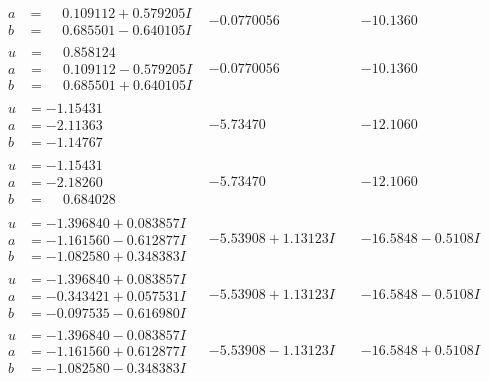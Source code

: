 \documentclass[1p]{elsarticle_modified}
\theoremstyle{definition}
\begin{document}
$$\begin{array}{c|c|c}
\begin{aligned}
a &= \phantom{-}0.109112 + 0.579205 I \\
b &= \phantom{-}0.685501 - 0.640105 I\end{aligned}
 & -0.0770056\phantom{ +0.000000I} & -10.1360\phantom{ +0.000000I} \\ \hline\begin{aligned}
u &= \phantom{-}0.858124\phantom{ +0.000000I} \\
a &= \phantom{-}0.109112 - 0.579205 I \\
b &= \phantom{-}0.685501 + 0.640105 I\end{aligned}
 & -0.0770056\phantom{ +0.000000I} & -10.1360\phantom{ +0.000000I} \\ \hline\begin{aligned}
u &= -1.15431\phantom{ +0.000000I} \\
a &= -2.11363\phantom{ +0.000000I} \\
b &= -1.14767\phantom{ +0.000000I}\end{aligned}
 & -5.73470\phantom{ +0.000000I} & -12.1060\phantom{ +0.000000I} \\ \hline\begin{aligned}
u &= -1.15431\phantom{ +0.000000I} \\
a &= -2.18260\phantom{ +0.000000I} \\
b &= \phantom{-}0.684028\phantom{ +0.000000I}\end{aligned}
 & -5.73470\phantom{ +0.000000I} & -12.1060\phantom{ +0.000000I} \\ \hline\begin{aligned}
u &= -1.396840 + 0.083857 I \\
a &= -1.161560 - 0.612877 I \\
b &= -1.082580 + 0.348383 I\end{aligned}
 & -5.53908 + 1.13123 I & -16.5848 - 0.5108 I \\ \hline\begin{aligned}
u &= -1.396840 + 0.083857 I \\
a &= -0.343421 + 0.057531 I \\
b &= -0.097535 - 0.616980 I\end{aligned}
 & -5.53908 + 1.13123 I & -16.5848 - 0.5108 I \\ \hline\begin{aligned}
u &= -1.396840 - 0.083857 I \\
a &= -1.161560 + 0.612877 I \\
b &= -1.082580 - 0.348383 I\end{aligned}
 & -5.53908 - 1.13123 I & -16.5848 + 0.5108 I \\ \hline\begin{aligned}

\end{aligned}
\end{array}$$
\end{document}
